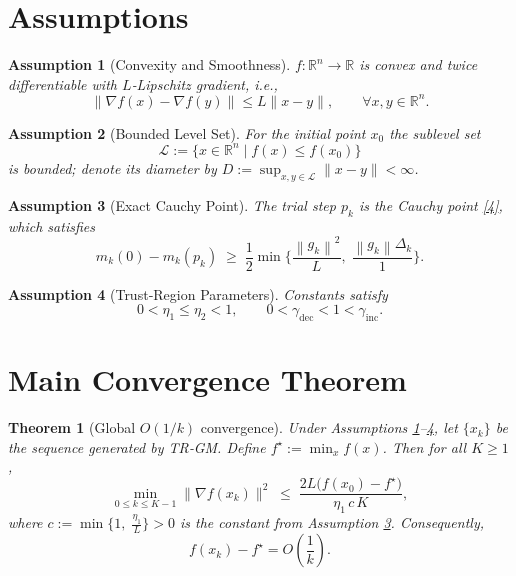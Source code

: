 \documentclass{article}
\newtheorem{theorem}{Theorem}
\newtheorem{assumption}{Assumption}
\newcommand{\norm}[1]{\left\lVert#1\right\rVert}
\newcommand{\R}{\mathbb{R}}
\begin{document}
\section*{Assumptions}
\begin{assumption}[Convexity and Smoothness]\label{as:convex}
$f:\R^{n}\rightarrow\R$ is convex and twice differentiable with
$L$‑Lipschitz gradient, i.e.,
\[
\|\nabla f(x)-\nabla f(y)\|\le L\|x-y\|,\qquad\forall x,y\in\R^{n}.
\tag{A1}
\]
\end{assumption}
\begin{assumption}[Bounded Level Set]\label{as:bounded}
For the initial point $x_{0}$ the sublevel set
\[
\mathcal{L}:=\{x\in\R^{n}\mid f(x)\le f(x_{0})\}
\]
is bounded; denote its diameter by $D:=\sup_{x,y\in\mathcal{L}}\|x-y\|<\infty$.
\end{assumption}
\begin{assumption}[Exact Cauchy Point]\label{as:cauchy}
The trial step $p_{k}$ is the Cauchy point \eqref{4}, which satisfies
\[
m_{k}(0)-m_{k}(p_{k})\;\ge\;\frac{1}{2}\min\!\Big\{
\frac{\norm{g_{k}}^{2}}{L},\;
\frac{\norm{g_{k}}\Delta_{k}}{1}\Big\}.
\tag{A3}
\]
\end{assumption}
\begin{assumption}[Trust‑Region Parameters]\label{as:params}
Constants satisfy
\[
0<\eta_{1}\le\eta_{2}<1,\qquad
0<\gamma_{\text{dec}}<1<\gamma_{\text{inc}}.
\tag{A4}
\]
\end{assumption}

\section*{Main Convergence Theorem}
\begin{theorem}[Global $O(1/k)$ convergence]\label{thm:rate}
Under Assumptions \ref{as:convex}–\ref{as:params},
let $\{x_{k}\}$ be the sequence generated by TR‑GM.
Define $f^{\star}:=\min_{x}f(x)$.  Then for all $K\ge1$,
\[
\min_{0\le k\le K-1}\|\nabla f(x_{k})\|^{2}
\;\le\;
\frac{2L\big(f(x_{0})-f^{\star}\big)}{\eta_{1}\,c\,K},
\tag{9}
\]
where $c:=\min\{1,\;\frac{\eta_{1}}{L}\}>0$ is the constant from
Assumption \ref{as:cauchy}.
Consequently,
\[
f(x_{k})-f^{\star}=O\!\left(\frac{1}{k}\right).
\]
\end{theorem}
\end{document}
